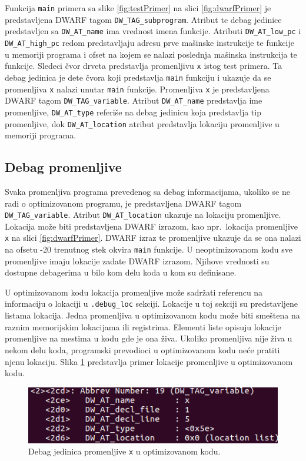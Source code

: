 \documentclass[12pt,oneside]{memoir}
\begin{document}
Funkcija \texttt{main} primera sa slike \ref{fig:testPrimer} na slici \ref{fig:dwarfPrimer} je predstavljena DWARF tagom \texttt{DW\_TAG\_subprogram}. Atribut te debag jedinice predstavljen sa \texttt{DW\_AT\_name} ima vrednost imena funkcije. Atributi \texttt{DW\_AT\_low\_pc} i \texttt{DW\_AT\_high\_pc} redom predstavljaju adresu prve mašinske instrukcije te funkcije u memoriji programa i ofset na kojem se nalazi poslednja mašinska instrukcija te funkcije. Sledeci čvor drveta predstavlja promenljivu \texttt{x} istog test primera. Ta debag jedinica je dete čvora koji predstavlja \texttt{main} funkciju i ukazuje da se promenljiva \texttt{x} nalazi unutar \texttt{main} funkcije. Promenljiva \texttt{x} je predstavljena DWARF tagom \texttt{DW\_TAG\_variable}. Atribut \texttt{DW\_AT\_name} predstavlja ime promenljive, \texttt{DW\_AT\_type} referiše na debag jedinicu koja predstavlja tip promenljive, dok \texttt{DW\_AT\_location} atribut predstavlja lokaciju promenljive u memoriji programa. 

\subsection{Debag promenljive}

Svaka promenljiva programa prevedenog sa debag informacijama, ukoliko se ne radi o optimizovanom programu, je predstavljena DWARF tagom \texttt{DW\_TAG\_variable}. Atribut \texttt{DW\_AT\_location} ukazuje na lokaciju promenljive. Lokacija može biti predstavljena DWARF izrazom, kao npr.~lokacija promenljive \texttt{x} na slici \ref{fig:dwarfPrimer}. DWARF izraz te promenljive ukazuje da se ona nalazi na ofsetu -20 trenutnog stek okvira \texttt{main} funkcije. U neoptimizovanom kodu sve promenljive imaju lokacije zadate DWARF izrazom. Njihove vrednosti su dostupne debagerima u bilo kom delu koda u kom su definisane.

U optimizovanom kodu lokacija promenljive može sadržati referencu na informaciju o lokaciji u \texttt{.debug\_loc} sekciji. Lokacije u toj sekciji su predstavljene listama lokacija. Jedna promenljiva u optimizovanom kodu može biti smeštena na raznim memorijskim lokacijama ili registrima. Elementi liste opisuju lokacije promenljive na mestima u kodu gde je ona živa. Ukoliko promenljiva nije živa u nekom delu koda, programski prevodioci u optimizovanom kodu neće pratiti njenu lokaciju. Slika \ref{fig:optPrimer} predstavlja primer lokacije promenljive u optimizovanom kodu.

\begin{figure}[h!]
	\begin{center}
		\includegraphics[scale=0.6]{slike/optimizovanPrimer.png}
	\end{center}
	\caption{Debag jedinica promenljive \texttt{x} u optimizovanom kodu.}
	\label{fig:optPrimer}
\end{figure}
\end{document}
